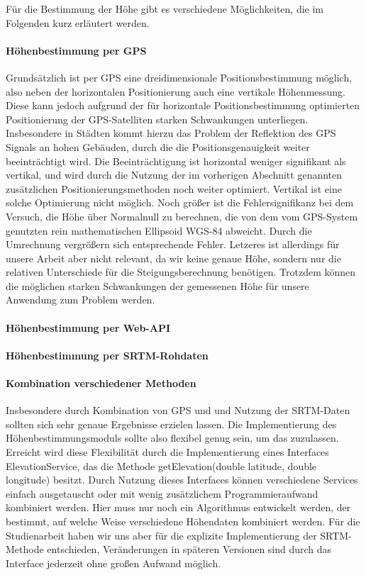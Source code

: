 Für die Bestimmung der Höhe gibt es verschiedene Möglichkeiten, die im Folgenden kurz erläutert werden.
\paragraph{Höhenbestimmung per GPS}
Grundsätzlich ist per GPS eine dreidimensionale Positionsbestimmung möglich, also neben der horizontalen Positionierung auch eine vertikale Höhenmessung. Diese kann jedoch aufgrund der für horizontale Positionsbestimmung optimierten Positionierung der GPS-Satelliten starken Schwankungen unterliegen. Insbesondere in Städten kommt hierzu das Problem der Reflektion des GPS Signals an hohen Gebäuden, durch die die Positionsgenauigkeit weiter beeinträchtigt wird. Die Beeinträchtigung ist horizontal weniger signifikant als vertikal, und wird durch die Nutzung der im vorherigen Abschnitt genannten zusätzlichen Positionierungsmethoden noch weiter optimiert. Vertikal ist eine solche Optimierung nicht möglich. Noch größer ist die Fehlersignifikanz bei dem Versuch, die Höhe über Normalnull zu berechnen, die von dem vom GPS-System genutzten rein mathematischen Ellipsoid WGS-84 abweicht. Durch die Umrechnung vergrößern sich entsprechende Fehler. \cite{gladstone} Letzeres ist allerdings für unsere Arbeit aber nicht relevant, da wir keine genaue Höhe, sondern nur die relativen Unterschiede für die Steigungsberechnung benötigen. Trotzdem können die möglichen starken Schwankungen der gemessenen Höhe für unsere Anwendung zum Problem werden.
\paragraph{Höhenbestimmung per Web-API}
\paragraph{Höhenbestimmung per SRTM-Rohdaten}
\paragraph{Kombination verschiedener Methoden}
Insbesondere durch Kombination von GPS und und Nutzung der SRTM-Daten sollten sich sehr genaue Ergebnisse erzielen lassen. Die Implementierung des Höhenbestimmungsmoduls sollte also flexibel genug sein, um das zuzulassen. Erreicht wird diese Flexibilität durch die Implementierung eines Interfaces ElevationService, das die Methode getElevation(double latitude, double longitude) besitzt. Durch Nutzung dieses Interfaces können verschiedene Services einfach ausgetauscht oder mit wenig zusätzlichem Programmieraufwand kombiniert werden. Hier muss nur noch ein Algorithmus entwickelt werden, der bestimmt, auf welche Weise verschiedene Höhendaten kombiniert werden. Für die Studienarbeit haben wir uns aber für die explizite Implementierung der SRTM-Methode entschieden, Veränderungen in späteren Versionen sind durch das Interface jederzeit ohne großen Aufwand möglich.
